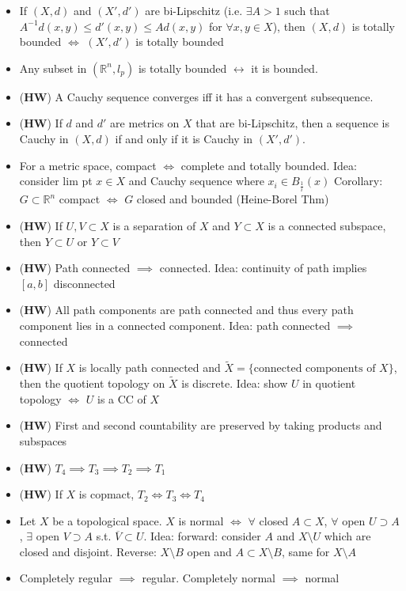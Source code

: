 \documentclass[frenchspacing,9pt,landscape,a4paper]{article}
\newcommand{\BR}{\mathbb R}
\theoremstyle{remark}
\begin{document}
\begin{multicols}{4}
\begin{itemize}
    \item If $(X,d)$ and $(X',d')$ are bi-Lipschitz (i.e. $\exists A > 1$ such that $A^{-1}d(x,y) \leq
        d'(x,y) \leq Ad(x,y)$ for $\forall x,y \in X$), then $(X,d)$ is totally bounded $\iff$ $(X',d')$ is totally bounded
    \item Any subset in $(\mathbb{R}^n, l_p)$ is totally bounded $\leftrightarrow$ it is bounded.
    \item (\textbf{HW}) A Cauchy sequence converges iff it has a convergent subsequence.
    \item (\textbf{HW}) If $d$ and $d'$ are metrics on $X$ that are bi-Lipschitz, then a sequence is Cauchy in $(X,d)$ if and only if it is Cauchy in $(X',d')$.
\item For a metric space, compact  $\iff$ complete and totally bounded. Idea: consider lim pt $x\in X$ and Cauchy sequence
    where $x_i\in B_{\frac{1}{i}}(x)$ Corollary:  $G\subset\BR^n$ compact
     $\iff$ $G$ closed and bounded (Heine-Borel Thm)
 \item (\textbf{HW}) If $U,V\subset X$ is a separation of  $X$ and  $Y\subset X$ is a connected subspace,
     then  $Y\subset U$ or  $Y\subset V$
 \item (\textbf{HW}) Path connected $\implies$ connected. Idea: continuity of path implies $[a,b]$
     disconnected
 \item (\textbf{HW}) All path components are path connected and thus every path component lies in a
     connected component. Idea: path connected $\implies$ connected
 \item (\textbf{HW}) If $X$ is locally path connected and $\tilde{X}=\{\text{connected components of }X\}$,
     then the quotient topology on $\tilde{X}$ is discrete. Idea: show $U$ in quotient topology  $\iff$
     $U$ is a CC of  $X$
 \item (\textbf{HW}) First and second countability are preserved by taking products and subspaces     
 \item (\textbf{HW}) $T_4\implies T_3\implies T_2\implies T_1$
 \item (\textbf{HW}) If $X$ is copmact,  $T_2\iff T_3\iff T_4$
 \item  Let $X$ be a topological space.  $X$ is normal  $\iff$  $\forall$ closed  $A\subset X$,  $\forall$
     open $U\supset A$,  $\exists$ open  $V\supset A$ s.t.  $\overline{V}\subset U$. Idea: forward:
     consider $A$ and  $X\setminus U$ which are closed and disjoint. Reverse:  $X\setminus B$ open and
     $A\subset X\setminus B$, same for  $X\setminus A$
 \item Completely regular $\implies$ regular. Completely normal  $\implies$ normal
\end{itemize}


\end{multicols}
\end{document}
